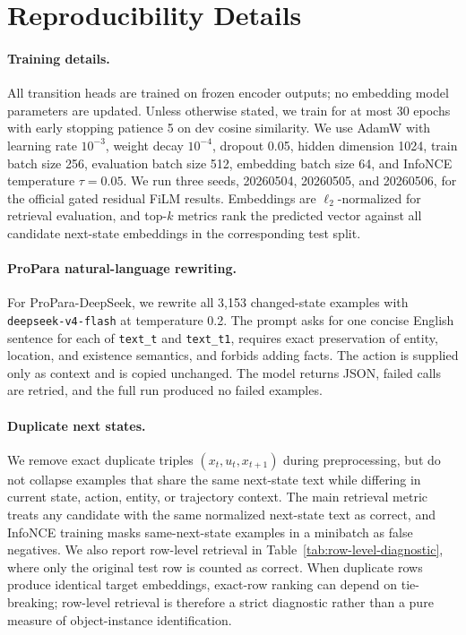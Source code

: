 \documentclass{article}
\begin{document}



\appendix

\section{Reproducibility Details}
\label{app:row-level}

\paragraph{Training details.}
All transition heads are trained on frozen encoder outputs; no embedding model parameters are updated. Unless otherwise stated, we train for at most 30 epochs with early stopping patience 5 on dev cosine similarity. We use AdamW with learning rate $10^{-3}$, weight decay $10^{-4}$, dropout 0.05, hidden dimension 1024, train batch size 256, evaluation batch size 512, embedding batch size 64, and InfoNCE temperature $\tau=0.05$. We run three seeds, 20260504, 20260505, and 20260506, for the official gated residual FiLM results. Embeddings are $\ell_2$-normalized for retrieval evaluation, and top-$k$ metrics rank the predicted vector against all candidate next-state embeddings in the corresponding test split.

\paragraph{ProPara natural-language rewriting.}
For ProPara-DeepSeek, we rewrite all 3,153 changed-state examples with \texttt{deepseek-v4-flash} at temperature 0.2. The prompt asks for one concise English sentence for each of \texttt{text\_t} and \texttt{text\_t1}, requires exact preservation of entity, location, and existence semantics, and forbids adding facts. The action is supplied only as context and is copied unchanged. The model returns JSON, failed calls are retried, and the full run produced no failed examples.

\paragraph{Duplicate next states.}
We remove exact duplicate triples $(x_t,u_t,x_{t+1})$ during preprocessing, but do not collapse examples that share the same next-state text while differing in current state, action, entity, or trajectory context. The main retrieval metric treats any candidate with the same normalized next-state text as correct, and InfoNCE training masks same-next-state examples in a minibatch as false negatives. We also report row-level retrieval in Table~\ref{tab:row-level-diagnostic}, where only the original test row is counted as correct. When duplicate rows produce identical target embeddings, exact-row ranking can depend on tie-breaking; row-level retrieval is therefore a strict diagnostic rather than a pure measure of object-instance identification.
\end{document}
